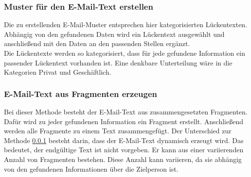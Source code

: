 		\subsubsection{Muster für den E-Mail-Text erstellen}
		\label{subsubsec:EMailMusterMethode}
		Die zu erstellenden E-Mail-Muster entsprechen hier kategorisierten Lückentexten. Abhängig von den gefundenen Daten wird ein Lückentext ausgewählt und anschließend mit den Daten an den passenden Stellen ergänzt.\\
		Die Lückentexte werden so kategorisiert, dass für jede gefundene Information ein passender Lückentext vorhanden ist. Eine denkbare Unterteilung wäre in die Kategorien Privat und Geschäftlich.
	
		\subsubsection{E-Mail-Text aus Fragmenten erzeugen}
		\label{subsubsec:EMailTextFragment}
		Bei dieser Methode besteht der E-Mail-Text aus zusammengesetzten Fragmenten. Dafür wird zu jeder gefundenen Information ein Fragment erstellt. Anschließend werden alle Fragmente zu einem Text zusammengefügt. Der Unterschied zur Methode \ref{subsubsec:EMailMusterMethode} besteht darin, dass der E-Mail-Text dynamisch erzeugt wird. Das bedeutet, der endgültige Text ist nicht vorgeben. Er kann aus einer variierenden Anzahl von Fragmenten bestehen. Diese Anzahl kann variieren, da sie abhängig von den gefundenen Informationen über die Zielperson ist.
		
		
		
